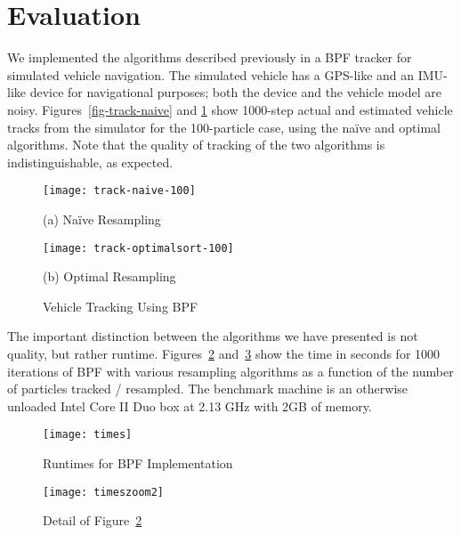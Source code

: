 \documentclass[12pt]{article}
\begin{document}
\section{Evaluation}

  We implemented the algorithms described previously in a
  BPF tracker for simulated vehicle navigation.  The
  simulated vehicle has a GPS-like and an IMU-like device
  for navigational purposes; both the device and the vehicle
  model are noisy.  Figures~\ref{fig-track-naive} and
  \ref{fig-track-optimal} show 1000-step actual and estimated vehicle
  tracks from the simulator for the 100-particle case, using
  the na\"ive and optimal algorithms.  Note
  that the quality of tracking of the two algorithms is
  indistinguishable, as expected.

  \begin{figure}
    \begin{minipage}{0.45\linewidth}
    \centering
    \texttt{[image: track-naive-100]}
    \begin{center}\small (a) Na\"ive Resampling\label{fig-track-naive}\end{center}
    \end{minipage}
    \begin{minipage}{0.45\linewidth}
    \centering
    \texttt{[image: track-optimalsort-100]}
    \begin{center}\small (b) Optimal Resampling\label{fig-track-optimal}\end{center}
    \end{minipage}
    \caption{Vehicle Tracking Using BPF}
  \end{figure}

  The important distinction between the algorithms we have
  presented is not
  quality, but rather runtime.
  Figures~\ref{fig-times} and~\ref{fig-timeszoom2} show the time
  in seconds for 1000 iterations of BPF with various
  resampling algorithms as a function of the number of
  particles tracked / resampled.  The benchmark machine is
  an otherwise unloaded Intel Core II Duo box at 2.13 GHz
  with 2GB of memory.

  \begin{figure}
    \centering
    \texttt{[image: times]}
    \caption{Runtimes for BPF Implementation}\label{fig-times}
  \end{figure}

  \begin{figure}
    \centering
    \texttt{[image: timeszoom2]}
    \caption{Detail of Figure~\ref{fig-times}}\label{fig-timeszoom2}
  \end{figure}
\end{document}
